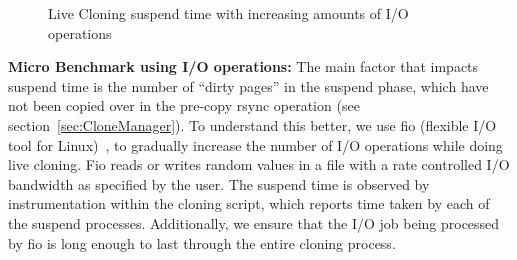 \begin{figure}[ht]
  \centering
\begin{adjustbox}{max size={.45\textwidth}}
  \end{adjustbox}
  \caption{Live Cloning suspend time with increasing amounts of I/O operations }
  \label{fig:fioResults}
\end{figure}


\noindent
\textbf{Micro Benchmark using I/O operations:}
The main factor that impacts suspend time is the number of ``dirty pages'' in the suspend phase, which have not been copied over in the pre-copy rsync operation (see section~\ref{sec:CloneManager}).
To understand this better, we use fio (flexible I/O tool for Linux)~\cite{fio}, to gradually increase the number of I/O operations while doing live cloning.
Fio reads or writes random values in a file with a rate controlled I/O bandwidth as specified by the user. 
The suspend time is observed by instrumentation within the cloning script, which reports time taken by each of the suspend processes.
Additionally, we ensure that the I/O job being processed by fio is long enough to last through the entire cloning process.


